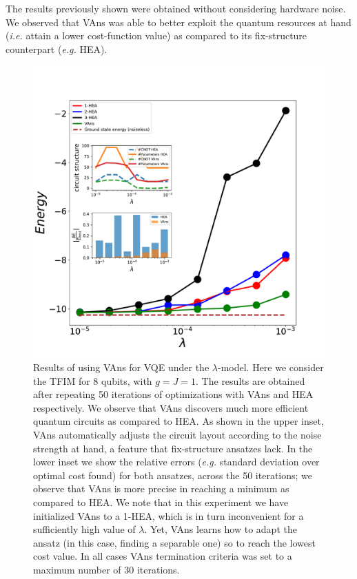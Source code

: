 
The results previously shown were obtained without considering hardware noise. We observed that VAns was able to better exploit the quantum resources at hand (\textit{i.e.} attain a lower cost-function value) as compared to its fix-structure counterpart (\textit{e.g.} HEA).

\begin{figure}[h!]
\centering
\includegraphics[width=.9\textwidth]{Figures/VANS/Fig13.pdf}
\caption{Results of using VAns for VQE under the $\lambda$-model. Here we consider the TFIM for 8 qubits, with $g=J=1$. The results are obtained after repeating 50 iterations of optimizations with VAns and HEA respectively. We observe that VAns discovers much more efficient quantum circuits as compared to HEA. As shown in the upper inset, VAns automatically adjusts the circuit layout according to the noise strength at hand, a feature that fix-structure ansatzes lack. In the lower inset we show the relative errors (\textit{e.g.} standard deviation over optimal cost found) for both ansatzes, across the 50 iterations; we observe that VAns is more precise in reaching a minimum as compared to HEA. We note that in this experiment we have initialized VAns to a 1-HEA, which is in turn inconvenient for a sufficiently high value of $\lambda$. Yet, VAns learns how to adapt the ansatz (in this case, finding a separable one) so to reach the lowest cost value. In all cases VAns termination criteria was set to a maximum number of 30 iterations.}
\label{fig:Fig13}
\end{figure}

